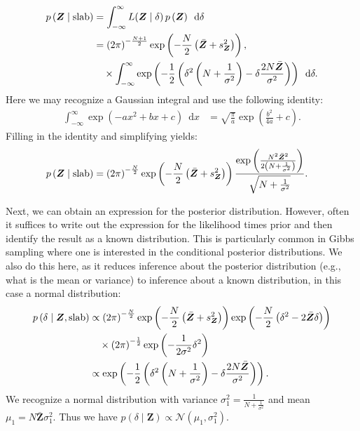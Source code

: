 \documentclass[a4paper]{article}
\newcommand{\shypo}[1]{%
	\ifnum#1>0%
		\mathrm{slab}
	\else%
		\mathrm{spike}
	\fi%
}
\newcommand{\dataZ}	{\bm{Z}}
\newcommand{\meanZ}	{\bar{\dataZ}}
\newcommand{\varZ}	{s_{\dataZ}^2}
\newcommand{\probp}[1]{p\left(#1\right)}
\newcommand{\lik}{L}
\newcommand{\dnorm}[2]{\mathcal{N}\left(#1, #2\right)}
\newcommand{\dx}[1]{\enspace\mathrm{d}{#1}}
\newenvironment{revision}{\color{teal}}{\color{black}}
\begin{document}
\begin{revision}
\begin{align*}
	\probp{\dataZ\mid\shypo{1}} &=\int_{-\infty}^{\infty} \lik(\dataZ \mid \delta) \, \probp{\dataZ} 	\dx{\delta}\\
	&=\left(2\pi\right)^{-\frac{N+1}{2}}
	\exp\left(-\frac{N}{2}\left(\meanZ + \varZ\right)\right), \\
	&\quad\times\int_{-\infty}^{\infty}
	\exp\left(-\frac{1}{2}\left(\delta^2\left(N + \frac{1}{\sigma^2}\right) -\delta \frac{2N\meanZ}{\sigma^2}\right)\right)
	\dx{\delta}.
\end{align*}
Here we may recognize a Gaussian integral and use the following identity:
\begin{align*}
	\int_{-\infty}^{\infty}\exp\left(-ax^2+bx+c\right)\dx{x} &= \sqrt{\frac{\pi}{a}}\exp\left(\frac{b^2}{4a}+c\right).
\end{align*}
Filling in the identity and simplifying yields:
\begin{align*}
	\probp{\dataZ\mid\shypo{1}} &= 	
	\left(2\pi\right)^{-\frac{N}{2}}
	\exp\left(-\frac{N}{2}\left(\meanZ + \varZ\right)\right)
	\frac{
		\exp\left(\frac{N^2 \meanZ^2}{2\left(N+\frac{1}{\sigma^2}\right)}\right)
	}{
		\sqrt{N+\frac{1}{\sigma^2}}
	}.
\end{align*}

Next, we can obtain an expression for the posterior distribution. However, often it suffices to write out the expression for the likelihood times prior and then identify the result as a known distribution. This is particularly common in Gibbs sampling where one is interested in the conditional posterior distributions. We also do this here, as it reduces inference about the posterior distribution (e.g., what is the mean or variance) to inference about a known distribution, in this case a normal distribution:
\begin{align*}
	\probp{\delta \mid \dataZ, \shypo{1}} &\propto  
	\left(2\pi\right)^{-\frac{N}{2}}
	\exp\left(-\frac{N}{2}\left(\meanZ + \varZ\right)\right) 
	\exp\left(-\frac{N}{2}\left(\delta^2 -2\meanZ\delta\right)\right)\\
	&\quad\times \left(2\pi\right)^{-\frac{1}{2}} \exp\left(-\frac{1}{2\sigma^2}\delta^2\right)\\
	&\propto 
	\exp\left(-\frac{1}{2}\left(\delta^2\left(N + \frac{1}{\sigma^2}\right) -\delta \frac{2N\meanZ}{\sigma^2}\right)\right).
\end{align*}
We recognize a normal distribution with variance $\sigma_1^2 = \frac{1}{N + \frac{1}{\sigma^2}}$ and mean $\mu_1 = N\meanZ\sigma_1^2$. Thus we have $\probp{\delta \mid \dataZ} \propto \dnorm{\mu_1}{\sigma_1^2}$.


\end{revision}
\end{document}
